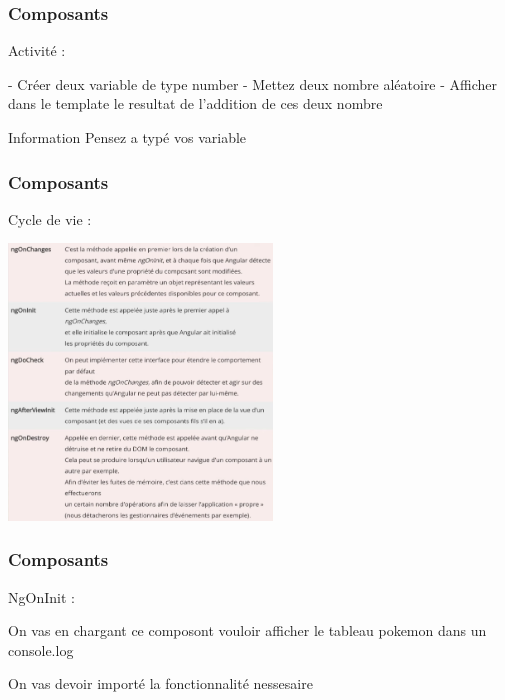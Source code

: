 \documentclass[10pt]{beamer}
\begin{document}
	\begin{frame}
		\frametitle{Composants}

		Activité : \newline \newline

		- Créer deux variable de type number \newline
		- Mettez deux nombre aléatoire \newline
		- Afficher dans le template le resultat de l'addition de ces deux nombre \newline \newline


		\begin{block}{Information}
			Pensez a typé vos variable
		\end{block}

	\end{frame}

	\begin{frame}
		\frametitle{Composants}

		Cycle de vie : \newline

		\centering
		\includegraphics[width=7cm]{assets/vie} \newline


	\end{frame}

	\begin{frame}
		\frametitle{Composants}

		NgOnInit : \newline \newline

		On vas en chargant ce composont \newline vouloir afficher le tableau pokemon dans un console.log \newline \newline

		On vas devoir importé la fonctionnalité nessesaire  \newline \newline


	\end{frame}
\end{document}
